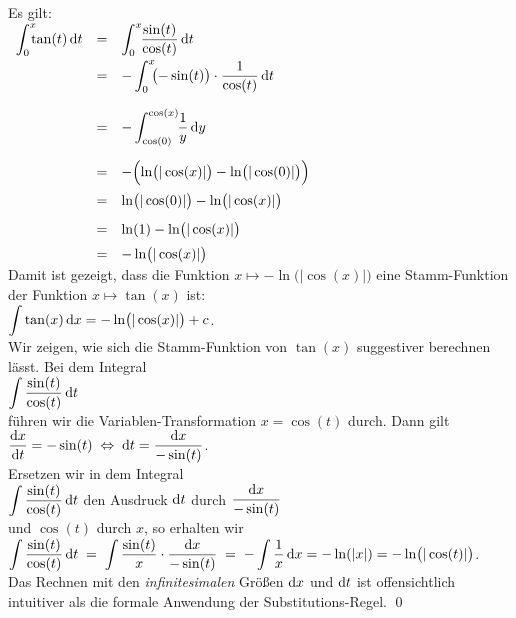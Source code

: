 \solution
Es gilt:
\\[0.2cm]
\hspace*{1.3cm}
$
\begin{array}[t]{lcl}
       \dint{0}{x} \tan(t) \, \dr t 
 & = & \dint{0}{x} \;\frac{\sin(t)}{\cos(t)}\, \dr t \\[0.3cm]
 & = & - \dint{0}{x} \;\bigl(- \sin(t)\bigr)\cdot \frac{1}{\cos(t)}\, \dr t \\[0.6cm]
 & = & - \dint{\cos(0)}{\cos(x)} \;\frac{1}{y}\, \dr y \\[0.6cm]
 & = & - \Bigl( \ln\bigl(|\cos(x)|\bigr) - \ln\bigl(|\cos(0)|\bigr) \Bigr) \\[0.3cm]
 & = & \ln\bigl(|\cos(0)|\bigr) - \ln\bigl(|\cos(x)|\bigr) \\[0.3cm]
 & = & \ln(1) - \ln\bigl(|\cos(x)|\bigr) \\[0.2cm]
 & = & - \ln\bigl(|\cos(x)|\bigr) 
\end{array}
$
\\[0.2cm]
Damit ist gezeigt, dass die Funktion  $x \mapsto -\ln\bigl(|\cos(x)|\bigr)$ eine Stamm-Funktion der
Funktion $x\mapsto\tan(x)$ ist:
\\[0.2cm]
\hspace*{1.3cm} $\displaystyle\int\tan(x)\, \textrm{d} x = - \ln\bigl(|\cos(x)|\bigr) + c$.
\\[0.2cm]
Wir zeigen, wie sich die Stamm-Funktion von $\tan(x)$ suggestiver berechnen l\"asst.  Bei dem
Integral
\\[0.2cm]
\hspace*{1.3cm}
 $\displaystyle\int \frac{\sin(t)}{\cos(t)}\,\textrm{d} t$ 
\\[0.2cm]
 f\"uhren wir die Variablen-Transformation $x =
\cos(t)$ durch.  Dann gilt
\\[0.2cm]
\hspace*{1.3cm}
 $\displaystyle\frac{\textrm{d} x}{\textrm{d} t} = -\sin(t) \;\Leftrightarrow\; \textrm{d} t = \frac{\textrm{d} x}{-\sin(t)}$.
\\[0.2cm]
Ersetzen wir in dem Integral
\\[0.2cm]
\hspace*{1.3cm}
 $\displaystyle\int \frac{\sin(t)}{\cos(t)}\,\textrm{d} t$ \quad den Ausdruck $\textrm{d} t$ durch \quad  $\displaystyle\frac{\textrm{d} x}{-\sin(t)}$ 
\\[0.2cm]
und $\cos(t)$ durch $x$,  so erhalten wir
\\[0.2cm]
\hspace*{1.3cm} 
$\displaystyle \int \frac{\sin(t)}{\cos(t)}\,\textrm{d} t \;=\; \int
\frac{\sin(t)}{x}\cdot \frac{\textrm{d} x}{-\sin(t)} \;=\; - \int \frac{1}{x}\, \textrm{d} x = -\ln(|x|) =
-\ln\bigl(|\cos(t)|\bigr) $.  
\\[0.2cm]
Das Rechnen mit den \emph{infinitesimalen} Gr\"o{\ss}en $\textrm{d} x$ und $\textrm{d} t$ ist
offensichtlich intuitiver als die formale Anwendung der Substitutions-Regel.  \qed


